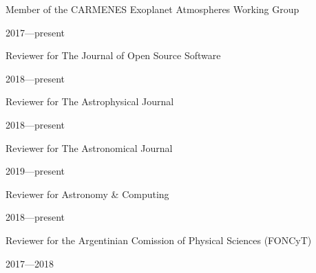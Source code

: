 \documentclass[12pt, a4paper]{article} %
\begin{document}
\begin{minipage}[t]{0.7\textwidth}
\begin{flushleft}%
  \setlength{\leftskip}{0.2cm}%
Member of the CARMENES Exoplanet Atmospheres Working Group 
\end{flushleft}
\end{minipage}
\begin{minipage}[t]{0.3\textwidth}
\hfill 2017---present
\end{minipage}

\begin{minipage}[t]{0.7\textwidth}
\begin{flushleft}%
  \setlength{\leftskip}{0.2cm}%
Reviewer for The Journal of Open Source Software
\end{flushleft}
\end{minipage}
\begin{minipage}[t]{0.3\textwidth}
\hfill 2018---present
\end{minipage}

\begin{minipage}[t]{0.7\textwidth}
\begin{flushleft}%
  \setlength{\leftskip}{0.2cm}%
Reviewer for The Astrophysical Journal
\end{flushleft}
\end{minipage}
\begin{minipage}[t]{0.3\textwidth}
\hfill 2018---present
\end{minipage}

\begin{minipage}[t]{0.7\textwidth}
\begin{flushleft}%
  \setlength{\leftskip}{0.2cm}%
Reviewer for The Astronomical Journal
\end{flushleft}
\end{minipage}
\begin{minipage}[t]{0.3\textwidth}
\hfill 2019---present
\end{minipage}

\begin{minipage}[t]{0.7\textwidth}
\begin{flushleft}%
  \setlength{\leftskip}{0.2cm}%
Reviewer for Astronomy \& Computing
\end{flushleft}
\end{minipage}
\begin{minipage}[t]{0.3\textwidth}
\hfill 2018---present
\end{minipage}

\begin{minipage}[t]{0.7\textwidth}
\begin{flushleft}%
  \setlength{\leftskip}{0.2cm}%
Reviewer for the Argentinian Comission of Physical Sciences (FONCyT)
\end{flushleft}
\end{minipage}
\begin{minipage}[t]{0.3\textwidth}
\hfill 2017---2018
\end{minipage}
\end{document}
